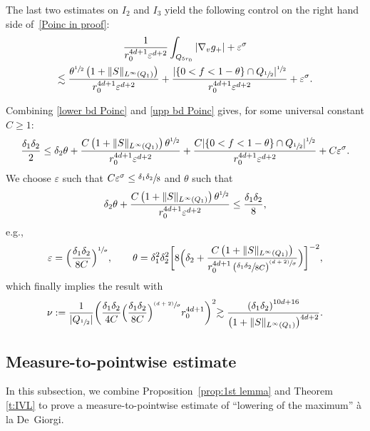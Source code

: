 \documentclass[11pt]{article}
\newcommand{\eg}{e.g.,\xspace}
\numberwithin{equation}{section}\let\oldbigcup\bigcup
\newcommand{\psfrac}[2]{\sfrac{(#1)}{#2}}
\theoremstyle{definition}
\theoremstyle{remark}
\let\var\varepsilon
\begin{document}
The last two estimates on $I_2$ and $I_3$ yield the following
control on the right hand side of~\eqref{Poinc in proof}:
\begin{multline}
\label{upp bd Poinc}
\frac{1}{r_0^{4d+1} \varepsilon^{d+2}}
\int_{Q_{5r_0}} |\nabla_v g_+| +
\varepsilon^\sigma\\
\lesssim
\frac{\theta^{\sfrac12}\left(1+\|S\|_{L^\infty(Q_1)}\right)}{r_0^{4d+1}
\varepsilon^{d+2}}
+ \frac{|\{0<f<1-\theta\}\cap
Q_{\sfrac12}|^{\sfrac12}}{r_0^{4d+1}\varepsilon^{d+2}}
+ \varepsilon^\sigma.
\end{multline}

Combining \eqref{lower bd Poinc} and \eqref{upp bd Poinc} gives,
for some universal constant $C\geq 1$:
\begin{equation}
\label{estim finale}
\frac{\delta_1 \delta_2}{2} \le \delta_2 \theta +
\frac{C\left(1+\|S\|_{L^\infty(Q_1)} \right)
\theta^{\sfrac12}}{r_0^{4d+1} \varepsilon^{d+2}}
+ \frac{C|\{0<f<1-\theta\}\cap
Q_{\sfrac12}|^{\sfrac12}}{r_0^{4d+1} \var^{d+2}} + C \varepsilon^\sigma.
\end{equation}
We choose $\varepsilon$ such that
$C\varepsilon^\sigma \leq \sfrac{\delta_1 \delta_2}{8}$ and
$\theta$ such that
\[
\delta_2 \theta + \frac{C\left(1+\|S\|_{L^\infty(Q_1)}\right)
\theta^{\sfrac12}}{r_0^{4d+1}\var^{d+2}} \leq \frac{\delta_1
\delta_2}{8},
\]
\eg
\begin{equation}
\label{eq:choice-theta}
\varepsilon=\Bigl(\frac{\delta_1\delta_2}{8C}\Bigr)^{\sfrac{1}{\sigma}},
\qquad
\theta= \delta_1^2 \delta_2^2 \biggl[ 8\Bigl( \delta_2 +
\frac{C\left(1+\|S\|_{L^\infty(Q_1)}\right)}{r_0^{4d+1} \left(
\sfrac{\delta_1\delta_2}{8C}
\right)^{\psfrac{d+2}{\sigma}}}\Bigr) \biggr]^{-2},
\end{equation}
which finally implies the result with
\begin{equation}
\label{eq:choice-nu}
\nu:= \frac{1}{|Q_{\sfrac12}|}\biggl(\frac{\delta_1\delta_2}{4C}
\Bigl(\frac{\delta_1\delta_2}{8C}\Bigr)^{\psfrac{d+2}{\sigma}}
r_0^{4d+1}\biggl)^2 \gtrsim
\frac{\left( \delta_1 \delta_2
\right)^{10d+16}}{\left(1+\|S\|_{L^\infty(Q_1)}\right)^{4d+2}}.
\end{equation}

\subsection{Measure-to-pointwise estimate}
\label{ss:m2p}

In this subsection, we combine Proposition~\ref{prop:1st lemma}
and Theorem \ref{t:IVL} to prove a measure-to-pointwise estimate
of ``lowering of the maximum'' à la De~Giorgi.
\end{document}
